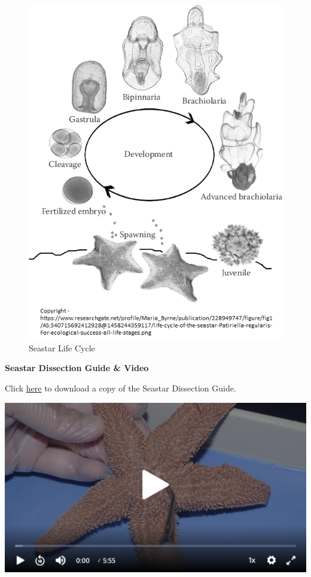 \documentclass[
]{book}
\begin{document}
\begin{figure}
\centering
\includegraphics{images/Lab8_seastar_life_cycle.png}
\caption{Seastar Life Cycle}
\end{figure}

\textbf{Seastar Dissection Guide \& Video}

Click \href{https://osf.io/download/z6v7w}{here} to download a copy of the Seastar Dissection Guide.

\includegraphics{images/Lab8_Seastar_Dissection_Video1.png}
\end{document}
